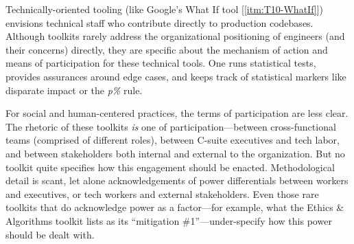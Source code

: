 \documentclass[acmsmall]{acmart}
\begin{document}

Technically-oriented tooling (like Google's What If tool [\ref{itm:T10-WhatIf}]) envisions technical staff who contribute directly to production codebases. Although toolkits rarely address the organizational positioning of engineers (and their concerns) directly, they are specific about the mechanism of action and means of participation for these technical tools. One runs statistical tests, provides assurances around edge cases, and keeps track of statistical markers like disparate impact or the \textit{p\%} rule. %

For social and human-centered practices, the terms of participation are less clear. The rhetoric of these toolkits \textit{is} one of participation---between cross-functional teams (comprised of different roles), between C-suite executives and tech labor, and between stakeholders both internal and external to the organization. But no toolkit quite specifies how this engagement should be enacted. Methodological detail is scant, let alone acknowledgements of power differentials between workers and executives, or tech workers and external stakeholders. Even those rare toolkits that do acknowledge power as a factor---for example, what the Ethics \& Algorithms toolkit lists as its ``mitigation \#1''---under-specify how this power should be dealt with.
\end{document}
